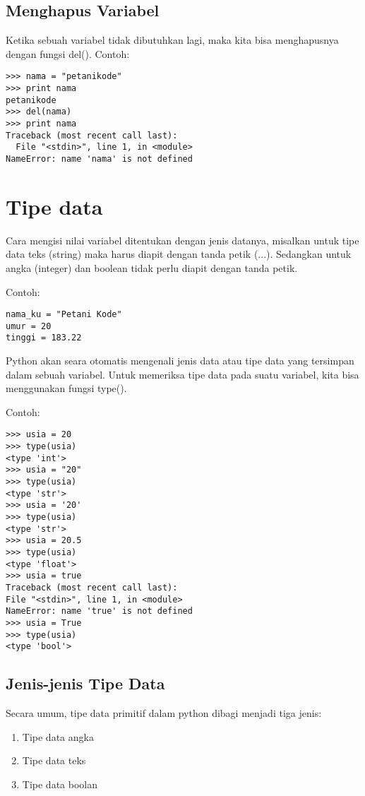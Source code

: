 \subsection{Menghapus Variabel}
Ketika sebuah variabel tidak dibutuhkan lagi, maka kita bisa menghapusnya dengan fungsi del().
Contoh:
\begin{verbatim}
>>> nama = "petanikode"
>>> print nama
petanikode
>>> del(nama)
>>> print nama
Traceback (most recent call last):
  File "<stdin>", line 1, in <module>
NameError: name 'nama' is not defined
\end{verbatim}

\section{Tipe data}
Cara mengisi nilai variabel ditentukan dengan jenis datanya, misalkan untuk tipe data teks (string) maka harus diapit dengan tanda petik (...). Sedangkan untuk angka (integer) dan boolean tidak perlu diapit dengan tanda petik.

Contoh:

\begin{verbatim}
nama_ku = "Petani Kode"
umur = 20
tinggi = 183.22
\end{verbatim}

Python akan seara otomatis mengenali jenis data atau tipe data yang tersimpan dalam sebuah variabel. Untuk memeriksa tipe data pada suatu variabel, kita bisa menggunakan fungsi type().

Contoh:

\begin{verbatim}
>>> usia = 20
>>> type(usia)
<type 'int'>
>>> usia = "20"
>>> type(usia)
<type 'str'>
>>> usia = '20'
>>> type(usia)
<type 'str'>
>>> usia = 20.5
>>> type(usia)
<type 'float'>
>>> usia = true
Traceback (most recent call last):
File "<stdin>", line 1, in <module>
NameError: name 'true' is not defined
>>> usia = True
>>> type(usia)
<type 'bool'>
\end{verbatim}

\subsection{Jenis-jenis Tipe Data}

Secara umum, tipe data primitif dalam python dibagi menjadi tiga jenis:

\begin{enumerate}
\item Tipe data angka
\item Tipe data teks
\item Tipe data boolan
\end{enumerate}


